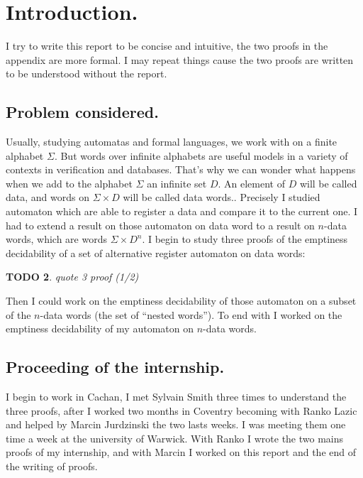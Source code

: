 \documentclass[a4paper,10pt]{report}
\title{}
\author{}
\newtheorem{td}{TODO}
\begin{document}
\maketitle

\begin{abstract}
\begin{td}
 I have to fill something sent by my teachers.
\end{td}

\end{abstract}


\section{Introduction.} 
I try to write this report to be concise and intuitive, the two proofs in the appendix are more formal.
I may repeat things cause the two proofs are written to be understood without the report.
\subsection{Problem considered.}
Usually, studying automatas and formal languages, we work with on a finite alphabet $\Sigma$.
But words over infinite alphabets are useful models in a variety of contexts in verification and databases.
That's why we can wonder what happens when we add to the alphabet $\Sigma$ an infinite set $D$.
An element of $D$ will be called data, and words on $\Sigma \times D$ will be called data words..
Precisely I studied automaton which are able to register a data and compare it to the current one.
I had to extend a result on those automaton on data word to a result on $n$-data words, which are words $\Sigma \times D^n$.
I begin to study three proofs of the emptiness decidability of a set of alternative register automaton on data words: 
\begin{td}
 quote 3 proof (1/2)
\end{td}
Then I could work on the emptiness decidability of those automaton on a subset of the $n$-data words (the set of ``nested words'').
To end with I worked on the emptiness decidability of my automaton on $n$-data words.
\subsection{Proceeding of the internship.} 
I begin to work in Cachan, I met Sylvain Smith three times to understand the three proofs, after I worked two months in Coventry becoming with Ranko Lazic and helped by Marcin Jurdzinski the two lasts weeks.
I was meeting them one time a week at the university of Warwick. With Ranko I wrote the two mains proofs of my internship, and with Marcin I worked on this report and the end of the writing of proofs.  
\end{document}
